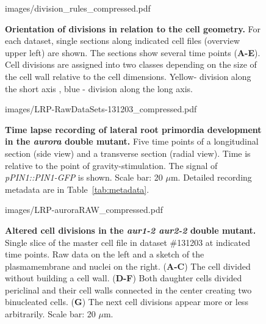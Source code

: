 \documentclass[11pt,a4paper, final]{article}
\begin{document}
%
\begin{figure}[htbp]
\centering
	\begin{overpic}[width=1.\linewidth]{images/division_rules_compressed.pdf}
	\end{overpic}
\caption[Orientation of divisions in relation to the cell geometry.]
{{\bf Orientation of divisions in relation to the cell geometry.} For each dataset, single sections along indicated cell files (overview upper left) are shown. The sections show several time points (\textbf{A-E}). Cell divisions are assigned into two classes depending on the size of the cell wall relative to the cell dimensions. Yellow- division along the short axis , blue - division along the long axis. }
	\label{fig:divrules}
\end{figure}
%
%
%
%
\begin{figure}[htbp]
\centering
	\begin{overpic}[width=1.\linewidth]{images/LRP-RawDataSets-131203_compressed.pdf}
	\end{overpic}
\caption[ Time lapse recording of lateral root primordia development in the \emph{aurora} double mutant.]
{{\bf Time lapse recording of lateral root primordia development in the \emph{aurora} double mutant.} Five time points of a longitudinal section (side view) and a transverse section (radial view). Time is relative to the point of gravity-stimulation. The signal of \emph{pPIN1::PIN1-GFP }is shown. Scale bar: 20 $\mu$m. Detailed recording metadata are in Table~\ref{tab:metadata}.}
\label{fig:auroraRaw}
\end{figure}
\clearpage
%
\begin{figure}[htbp]
\centering
	\begin{overpic}[width=0.9\linewidth]{images/LRP-auroraRAW_compressed.pdf}
	\end{overpic}
\caption[Altered cell divisions in the \emph{aur1-2 aur2-2} double mutant. ]
{{\bf Altered cell divisions in the \emph{aur1-2 aur2-2} double mutant. } Single slice of the master cell file in dataset \#131203 at indicated time points. Raw data on the left and a sketch of the plasmamembrane and nuclei on the right. (\textbf{A-C}) The cell divided without building a cell wall. (\textbf{D-F}) Both daughter cells divided periclinal and their cell walls connected in the center creating two binucleated cells. (\textbf{G}) The next cell divisions appear more or less arbitrarily. Scale bar: 20 $\mu$m.}
	\label{fig:aurora}
\end{figure}
\clearpage
\end{document}
